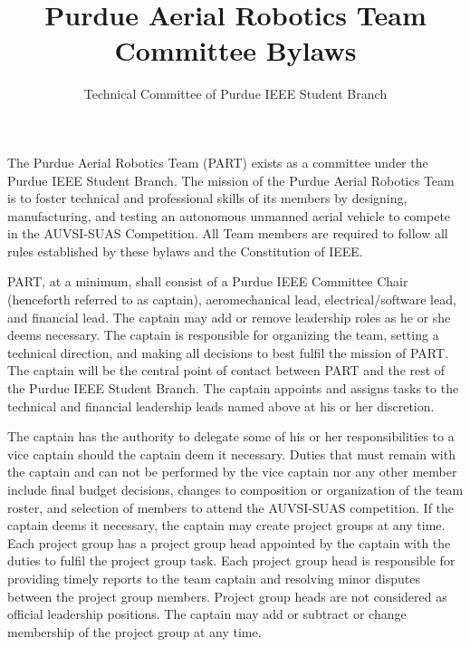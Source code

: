 \documentclass[12pt]{constitution}
\title{Purdue Aerial Robotics Team Committee Bylaws}
\author{Technical Committee of Purdue IEEE Student Branch}
\date{}
\begin{document}

\titlecontentspage
\newpage

\label{art:nampup}
The Purdue Aerial Robotics Team (PART) exists as a committee under the Purdue IEEE Student Branch. The mission of the Purdue Aerial Robotics Team is to foster technical and professional skills of its members by designing, manufacturing, and testing an autonomous unmanned aerial vehicle to compete in the AUVSI-SUAS Competition. All Team members are required to follow all rules established by these bylaws and the Constitution of IEEE.


\label{art:memberlead}

PART, at a minimum, shall consist of a Purdue IEEE Committee Chair (henceforth referred to as captain), aeromechanical lead, electrical/software lead, and financial lead. The captain may add or remove leadership roles as he or she deems necessary. The captain is responsible for organizing the team, setting a technical direction, and making all decisions to best fulfil the mission of PART. The captain will be the central point of contact between PART and the rest of the Purdue IEEE Student Branch. The captain appoints and assigns tasks to the technical and financial leadership leads named above at his or her discretion.

The captain has the authority to delegate some of his or her responsibilities to a vice captain should the captain deem it necessary. Duties that must remain with the captain and can not be performed by the vice captain nor any other member include final budget decisions, changes to composition or organization of the team roster, and selection of members to attend the AUVSI-SUAS competition. If the captain deems it necessary, the captain may create project groups at any time. Each project group has a project group head appointed by the captain with the duties to fulfil the project group task. Each project group head is responsible for providing timely reports to the team captain and resolving minor disputes between the project group members. Project group heads are not considered as official leadership positions. The captain may add or subtract or change membership of the project group at any time.
\end{document}
